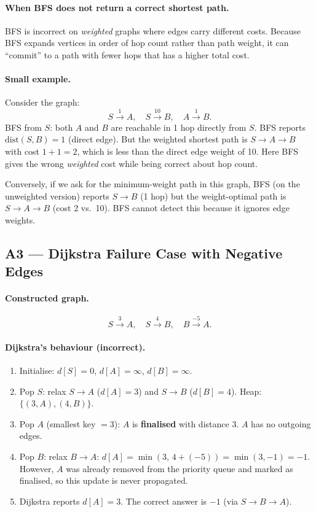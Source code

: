 \documentclass[11pt,a4paper]{article}
\begin{document}
\paragraph{When BFS does not return a correct shortest path.}
BFS is incorrect on \emph{weighted} graphs where edges carry different costs. Because BFS expands vertices in order of hop count rather than path weight, it can ``commit'' to a path with fewer hops that has a higher total cost.

\paragraph{Small example.}
Consider the graph:
\[
S \xrightarrow{1} A,\quad S \xrightarrow{10} B,\quad A \xrightarrow{1} B.
\]
BFS from $S$: both $A$ and $B$ are reachable in 1 hop directly from $S$.  BFS reports $\mathrm{dist}(S,B) = 1$ (direct edge).  But the weighted shortest path is $S \to A \to B$ with cost $1+1=2$, which is less than the direct edge weight of 10.  Here BFS gives the wrong \emph{weighted} cost while being correct about hop count.

Conversely, if we ask for the minimum-weight path in this graph, BFS (on the unweighted version) reports $S \to B$ (1 hop) but the weight-optimal path is $S \to A \to B$ (cost 2 vs.\ 10). BFS cannot detect this because it ignores edge weights.

\subsection{A3 --- Dijkstra Failure Case with Negative Edges}

\paragraph{Constructed graph.}
\[
S \xrightarrow{3} A,\quad S \xrightarrow{4} B,\quad B \xrightarrow{-5} A.
\]

\paragraph{Dijkstra's behaviour (incorrect).}
\begin{enumerate}[noitemsep]
  \item Initialise: $d[S]=0$, $d[A]=\infty$, $d[B]=\infty$.
  \item Pop $S$: relax $S \to A$ ($d[A]=3$) and $S \to B$ ($d[B]=4$). Heap: $\{(3,A),(4,B)\}$.
  \item Pop $A$ (smallest key $= 3$): $A$ is \textbf{finalised} with distance 3. $A$ has no outgoing edges.
  \item Pop $B$: relax $B \to A$: $d[A] = \min(3,\, 4+(-5)) = \min(3,-1) = -1$. However, $A$ was already removed from the priority queue and marked as finalised, so this update is never propagated.
  \item Dijkstra reports $d[A] = 3$.  The correct answer is $-1$ (via $S \to B \to A$).
\end{enumerate}
\end{document}
